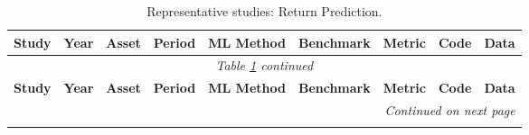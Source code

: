 \begin{longtable}{@{}p{2.4cm} c p{1.0cm} p{1.0cm} p{2.0cm} p{1.9cm} p{1.4cm} c p{1.4cm}@{}}
\caption{Representative studies: Return Prediction.}\label{tab:master_returns} \\
\toprule
\textbf{Study} & \textbf{Year} & \textbf{Asset} & \textbf{Period} & \textbf{ML Method} & \textbf{Benchmark} & \textbf{Metric} & \textbf{Code} & \textbf{Data} \\
\midrule
\endfirsthead
\multicolumn{9}{c}{\textit{Table \ref{tab:master_returns} continued}} \\
\toprule
\textbf{Study} & \textbf{Year} & \textbf{Asset} & \textbf{Period} & \textbf{ML Method} & \textbf{Benchmark} & \textbf{Metric} & \textbf{Code} & \textbf{Data} \\
\midrule
\endhead
\midrule
\multicolumn{9}{r}{\textit{Continued on next page}} \\
\endfoot
\bottomrule
\endlastfoot


\end{longtable}

